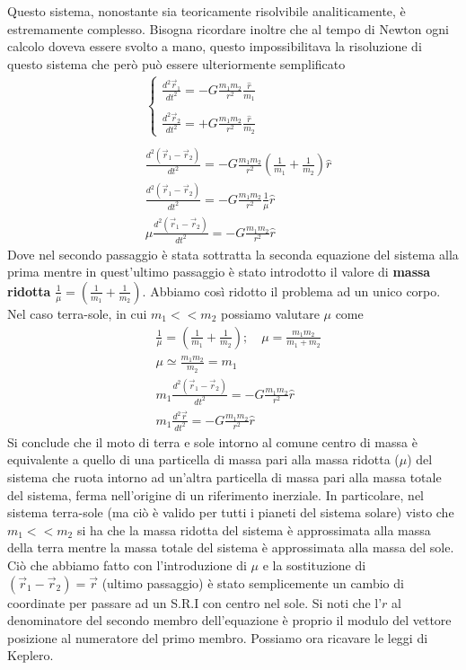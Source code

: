 Questo sistema, nonostante sia teoricamente risolvibile analiticamente, è estremamente complesso. Bisogna ricordare inoltre che al tempo di Newton ogni calcolo doveva essere svolto a mano, questo impossibilitava la risoluzione di questo sistema che però può essere ulteriormente semplificato
\begin{align*}
	&\begin{cases}
		\frac{d^2\vec{r}_1}{dt^2} = -G\frac{m_1m_2}{r^2}\frac{\hat{r}}{m_1}\\\\
		\frac{d^2\vec{r}_2}{dt^2} = +G\frac{m_1m_2}{r^2}\frac{\hat{r}}{m_2}
	\end{cases}\\\\
&\frac{d^2(\vec{r}_1-\vec{r}_2)}{dt^2} = -G\frac{m_1m_2}{r^2}(\frac{1}{m_1}+\frac{1}{m_2})\hat{r}\\
&\frac{d^2(\vec{r}_1-\vec{r}_2)}{dt^2} = -G\frac{m_1m_2}{r^2}\frac{1}{\mu}\hat{r}\\
&\mu\frac{d^2(\vec{r}_1-\vec{r}_2)}{dt^2} = -G\frac{m_1m_2}{r^2}\hat{r}
\end{align*}
Dove nel secondo passaggio è stata sottratta la seconda equazione del sistema alla prima mentre in quest'ultimo passaggio è stato introdotto il valore di \textbf{massa ridotta} $\frac{1}{\mu} = (\frac{1}{m_1}+\frac{1}{m_2})$. Abbiamo così ridotto il problema ad un unico corpo. Nel caso terra-sole, in cui $m_1<<m_2$ possiamo valutare $\mu$ come
\begin{align*}
	&\frac{1}{\mu} = (\frac{1}{m_1}+\frac{1}{m_2}); \quad \mu = \frac{m_1m_2}{m_1+m_2}\\
	&\mu \simeq \frac{m_1m_2}{m_2} = m_1\\
	&m_1\frac{d^2(\vec{r}_1-\vec{r}_2)}{dt^2} = -G\frac{m_1m_2}{r^2}\hat{r}\\
	&m_1\frac{d^2\vec{r}}{dt^2} = -G\frac{m_1m_2}{r^2}\hat{r}
\end{align*}
Si conclude che il moto di terra e sole intorno al comune centro di massa è equivalente a quello di una particella di massa pari alla massa ridotta ($\mu$) del sistema che ruota intorno ad un’altra particella di massa pari alla massa totale del sistema, ferma nell’origine di un riferimento inerziale. In particolare, nel sistema terra-sole (ma ciò è valido per tutti i pianeti del sistema solare) visto che $m_1<<m_2$ si ha che la massa ridotta del sistema è approssimata alla massa della terra mentre la massa totale del sistema è approssimata alla massa del sole. Ciò che abbiamo fatto con l'introduzione di $\mu$ e la sostituzione di $(\vec{r}_1-\vec{r}_2) = \vec{r}$ (ultimo passaggio) è stato semplicemente un cambio di coordinate per passare ad un S.R.I con centro nel sole. Si noti che l'$r$ al denominatore del secondo membro dell'equazione è proprio il modulo del vettore posizione al numeratore del primo membro. Possiamo ora ricavare le leggi di Keplero.
